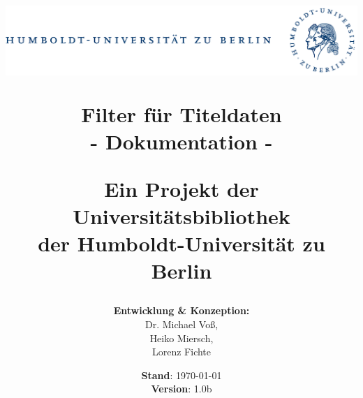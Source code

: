 \documentclass[10pt]{article}
\begin{document}
\title{
\begin{center}\includegraphics*[width=15cm]{hukombi-eps-converted-to.pdf} \end{center}
\vspace{2cm}
Filter für Titeldaten \\
- Dokumentation - \\
\vspace{1.5cm}
\begin{normalsize}
Ein Projekt der Universitätsbibliothek \\
der Humboldt-Universität zu Berlin
\end{normalsize}
\vspace{2cm}
}

\author{\textbf{Entwicklung \& Konzeption:} \\
	Dr. Michael Voß, \\
	Heiko Miersch, \\
	Lorenz Fichte} 
\date{\textbf{Stand}: \today \\
\vspace{1cm}
\textbf{Version}: 1.0b \\
\vspace{1cm}
}

\maketitle
\newpage
{}

\begin{spacing}{1.0}
\tableofcontents
\thispagestyle{empty}
\end{spacing}
\newpage


\setcounter{page}{1}
\newpage

\end{document}
